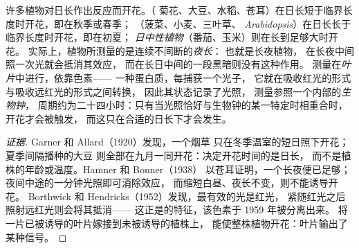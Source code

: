 \begin{proposition}\label{prop:b2:plant-flowering:photoperiod}
许多植物对日长作出反应而开花。\emph{}（
菊花、大豆、水稻、苍耳）在日长短于临界长度时开花，即在秋季或春季；
\emph{}（菠菜、小麦、三叶草、
\emph{Arabidopsis}）在日长长于临界长度时开花，即在初夏；
\emph{日中性植物}（番茄、玉米）则在长到足够大时开花。
实际上，植物所测量的是连续不间断的\emph{夜长}：
也就是长夜植物，
在长夜中间照一次光就会抵消其效应，
而在长日中间的一段黑暗则没有这种作用。
测量在\emph{叶片}中进行，依靠色素\emph{}——
一种蛋白质，每捕获一个光子，
它就在吸收红光的形式与吸收远红光的形式之间转换，
因此其状态记录了光照，
测量参照一个内部的\emph{生物钟}，
周期约为二十四小时：只有当光照恰好与生物钟的某一特定时相重合时，
开花才会被触发，
而这只在合适的日长下才会发生。
\end{proposition}
\begin{proof}[证据]
Garner 和 Allard（1920）发现，一个烟草
只在冬季温室的短日照下开花；夏季间隔播种的大豆
则全部在九月一同开花：决定开花时间的是日长，
而不是植株的年龄或温度。Hamner 和 Bonner（1938）
以苍耳证明，一个长夜便已足够；
夜间中途的一分钟光照即可消除效应，
而缩短白昼、夜长不变，则不能诱导开花。
Borthwick 和 Hendricks（1952）发现，最有效的光是红光，
紧随红光之后照射远红光则会将其抵消——
这正是的特征，该色素于 1959 年被分离出来。
将一片已被诱导的叶片嫁接到未被诱导的植株上，
能使整株植物开花：叶片输出了某种信号。
\end{proof}

